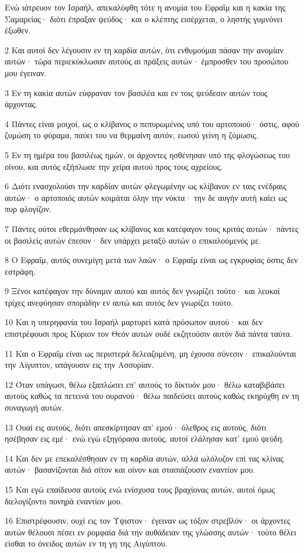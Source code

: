 \par Ενώ ιάτρευον τον Ισραήλ, απεκαλύφθη τότε η ανομία του Εφραΐμ και η κακία της Σαμαρείας· διότι έπραξαν ψεύδος· και ο κλέπτης εισέρχεται, ο ληστής γυμνόνει έξωθεν.
\par 2 Και αυτοί δεν λέγουσιν εν τη καρδία αυτών, ότι ενθυμούμαι πάσαν την ανομίαν αυτών· τώρα περιεκύκλωσαν αυτούς αι πράξεις αυτών· έμπροσθεν του προσώπου μου έγειναν.
\par 3 Εν τη κακία αυτών εύφραναν τον βασιλέα και εν τοις ψεύδεσιν αυτών τους άρχοντας.
\par 4 Πάντες είναι μοιχοί, ως ο κλίβανος ο πεπυρωμένος υπό του αρτοποιού· όστις, αφού ζυμώση το φύραμα, παύει του να θερμαίνη αυτόν, εωσού γείνη η ζύμωσις.
\par 5 Εν τη ημέρα του βασιλέως ημών, οι άρχοντες ησθένησαν υπό της φλογώσεως του οίνου, και αυτός εξήπλωσε την χείρα αυτού προς τους αχρείους.
\par 6 Διότι ενασχολούσι την καρδίαν αυτών φλεγωμένην ως κλίβανον εν ταις ενέδραις αυτών· ο αρτοποιός αυτών κοιμάται όλην την νύκτα· την δε αυγήν αυτή καίει ως πυρ φλογίζον.
\par 7 Πάντες ούτοι εθερμάνθησαν ως κλίβανος και κατέφαγον τους κριτάς αυτών· πάντες οι βασιλείς αυτών έπεσον· δεν υπάρχει μεταξύ αυτών ο επικαλούμενός με.
\par 8 Ο Εφραΐμ, αυτός συνεμίγη μετά των λαών· ο Εφραΐμ είναι ως εγκρυφίας όστις δεν εστράφη.
\par 9 Ξένοι κατέφαγον την δύναμιν αυτού και αυτός δεν γνωρίζει τούτο· και λευκαί τρίχες ανεφύησαν σποράδην εν αυτώ και αυτός δεν γνωρίζει τούτο.
\par 10 Και η υπερηφανία του Ισραήλ μαρτυρεί κατά πρόσωπον αυτού· και δεν επιστρέφουσι προς Κύριον τον Θεόν αυτών ουδέ εκζητούσιν αυτόν διά πάντα ταύτα.
\par 11 Και ο Εφραΐμ είναι ως περιστερά δελεαζομένη, μη έχουσα σύνεσιν· επικαλούνται την Αίγυπτον, υπάγουσιν εις την Ασσυρίαν.
\par 12 Όταν υπάγωσι, θέλω εξαπλώσει επ' αυτούς το δίκτυόν μου· θέλω καταβιβάσει αυτούς καθώς τα πετεινά του ουρανού· θέλω παιδεύσει αυτούς καθώς εκηρύχθη εν τη συναγωγή αυτών.
\par 13 Ουαί εις αυτούς, διότι απεσκίρτησαν απ' εμού· όλεθρος εις αυτούς, διότι ησέβησαν εις εμέ· ενώ εγώ εξηγόρασα αυτούς, αυτοί ελάλησαν κατ' εμού ψεύδη.
\par 14 Και δεν με επεκαλέσθησαν εν τη καρδία αυτών, αλλά ωλόλυζον επί τας κλίνας αυτών· βασανίζονται διά σίτον και οίνον και στασιάζουσιν εναντίον μου.
\par 15 Και εγώ επαίδευσα αυτούς ενώ ενίσχυσα τους βραχίονας αυτών, αυτοί όμως διελογίζοντο πονηρά εναντίον μου.
\par 16 Επιστρέφουσιν, ουχί εις τον Υψιστον· έγειναν ως τόξον στρεβλόν· οι άρχοντες αυτών θέλουσι πέσει εν ρομφαία διά την αυθάδειαν της γλώσσης αυτών· τούτο θέλει είσθαι το όνειδος αυτών εν τη γη της Αιγύπτου.

